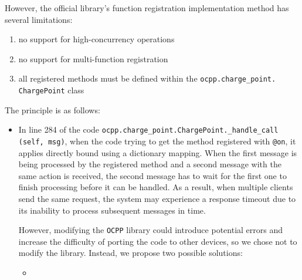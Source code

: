 \documentclass[
english,
ruledheaders=section,%
class=report,%
thesis={type=Report},%
accentcolor=9c,%
custommargins=true,%
marginpar=false,%
parskip=half-,%
fontsize=11pt,%
logofile={img/tuda_logo.pdf}, %
]{tudapub}
\begin{document}
    However, the official library's function registration implementation method has several limitations:
    \begin{enumerate}
        \item no support for high-concurrency operations
        \item no support for multi-function registration
        \item all registered methods must be defined within the \texttt{ocpp.charge\_point.\\ChargePoint} class
    \end{enumerate}
    The principle is as follows:
    \begin{itemize}
        \item %

        In line 284 of the code \texttt{ocpp.charge\_point.ChargePoint.\_handle\_call\\(self, msg)}, when the code trying to get the method registered with \texttt{@on}, it applies directly bound using a dictionary mapping. When the first message is being processed by the registered method and a second message with the same action is received, the second message has to wait for the first one to finish processing before it can be handled. As a result, when multiple clients send the same request, the system may experience a response timeout due to its inability to process subsequent messages in time.

        However, modifying the \texttt{OCPP} library could introduce potential errors and increase the difficulty of porting the code to other devices, so we chose not to modify the library. Instead, we propose two possible solutions:

        \begin{itemize}
            \item %


\end{itemize}
\end{itemize}
\end{document}
